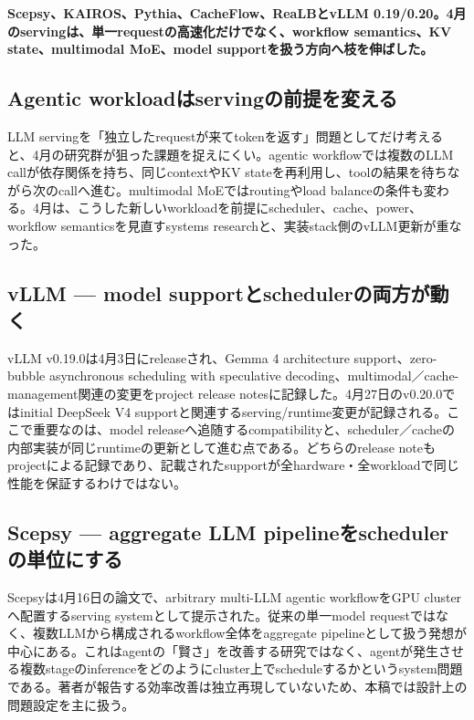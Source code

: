 \noindent\textbf{Scepsy、KAIROS、Pythia、CacheFlow、ReaLBとvLLM 0.19/0.20。4月のservingは、単一requestの高速化だけでなく、workflow semantics、KV state、multimodal MoE、model supportを扱う方向へ枝を伸ばした。}\autocite{src-0fc9d11483aa,src-2a6eae37bd39,src-551442a9e215,src-b790ec92aa01,src-d91793d0a6fa,src-e1e959857ced,src-fe12f92c05d7}

\subsection{Agentic workloadはservingの前提を変える}

LLM servingを「独立したrequestが来てtokenを返す」問題としてだけ考えると、4月の研究群が狙った課題を捉えにくい。agentic workflowでは複数のLLM callが依存関係を持ち、同じcontextやKV stateを再利用し、toolの結果を待ちながら次のcallへ進む。multimodal MoEではroutingやload balanceの条件も変わる。4月は、こうした新しいworkloadを前提にscheduler、cache、power、workflow semanticsを見直すsystems researchと、実装stack側のvLLM更新が重なった。\autocite{src-0fc9d11483aa,src-2a6eae37bd39,src-551442a9e215,src-b790ec92aa01,src-d91793d0a6fa,src-e1e959857ced,src-fe12f92c05d7}


\subsection{vLLM — model supportとschedulerの両方が動く}

vLLM v0.19.0は4月3日にreleaseされ、Gemma 4 architecture support、zero-bubble asynchronous scheduling with speculative decoding、multimodal／cache-management関連の変更をproject release notesに記録した。4月27日のv0.20.0ではinitial DeepSeek V4 supportと関連するserving/runtime変更が記録される。ここで重要なのは、model releaseへ追随するcompatibilityと、scheduler／cacheの内部実装が同じruntimeの更新として進む点である。どちらのrelease noteもprojectによる記録であり、記載されたsupportが全hardware・全workloadで同じ性能を保証するわけではない。\autocite{src-b790ec92aa01,src-fe12f92c05d7}


\subsection{Scepsy — aggregate LLM pipelineをschedulerの単位にする}

Scepsyは4月16日の論文で、arbitrary multi-LLM agentic workflowをGPU clusterへ配置するserving systemとして提示された。従来の単一model requestではなく、複数LLMから構成されるworkflow全体をaggregate pipelineとして扱う発想が中心にある。これはagentの「賢さ」を改善する研究ではなく、agentが発生させる複数stageのinferenceをどのようにcluster上でscheduleするかというsystem問題である。著者が報告する効率改善は独立再現していないため、本稿では設計上の問題設定を主に扱う。\autocite{src-e1e959857ced}


